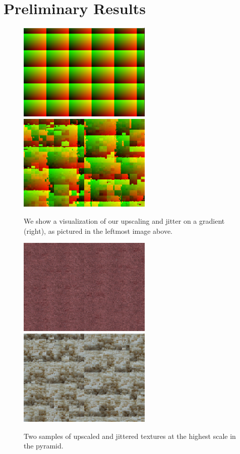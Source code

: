 \documentclass[12pt]{article}
\begin{document}
    \section{Preliminary Results}
        \begin{figure}[H]
            \centering
            \includegraphics[width=2.5in]{result3.png}
            \includegraphics[width=2.5in]{result0.png}
            \caption{We show a visualization of our upscaling and jitter on a gradient (right), as pictured in the leftmost image above.}
        \end{figure}
        \begin{figure}[H]
            \centering
            \includegraphics[width=2.5in]{result1.png}
            \includegraphics[width=2.5in]{result2.png}
            \caption{Two samples of upscaled and jittered textures at the highest scale in the pyramid.}
        \end{figure}
\end{document}

